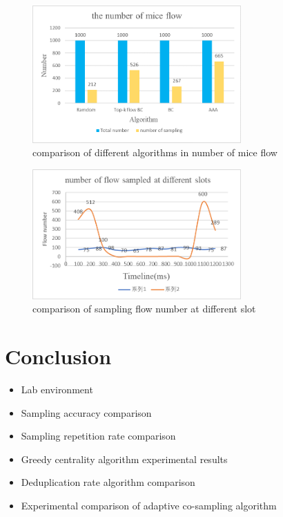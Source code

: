 \documentclass[conference,compsoc]{IEEEtran}
\begin{document}
\begin{figure}[!hhhhhhhhhht]
\centering
\includegraphics[width=8cm]{images/cmp_mice_flownum.png}
\caption{comparison of different algorithms in number of mice flow}
\label{aaa.png}
\end{figure}

\begin{figure}[!hhhhhhhhhht]
\centering
\includegraphics[width=8cm]{images/num_slot.png}
\caption{comparison of sampling flow number at different slot}
\label{aaa.png}
\end{figure}



 





 


\section{Conclusion}
\begin{itemize}
\item Lab environment
\item Sampling accuracy comparison
\item Sampling repetition rate comparison
\item Greedy centrality algorithm experimental results
 
\item Deduplication rate algorithm comparison

\item Experimental comparison of adaptive co-sampling algorithm
\end{itemize}
\end{document}
